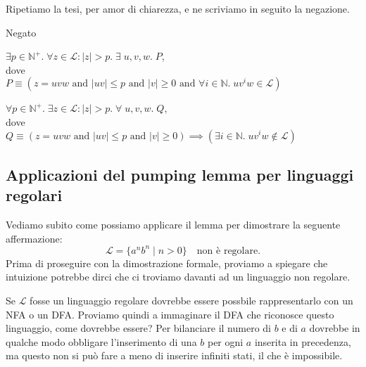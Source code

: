 \documentclass[class=book, crop=false, oneside, 12pt]{standalone}
\begin{document}
Ripetiamo la tesi, per amor di chiarezza, e ne scriviamo in seguito la negazione.
\begin{labeling}{Negato}
    \item[Tesi] 
    \(\exists p \in \mathbb{N}^+ . \;\forall z \in \mathcal{L}:|z|>p . \; \exists \;u, v, w . \; P\), \\ 
    dove \\
    \(P \equiv (z = uvw \textrm{ and } |uv| \le p \textrm{ and } |v| \ge 0 \textrm{ and } \forall i \in \mathbb{N} . \; uv^iw \in \mathcal{L}) \)
    \item[Negato]
    \(\forall p \in \mathbb{N}^+ . \;\exists z \in \mathcal{L}:|z|>p . \; \forall \;u, v, w . \; Q\), \\
    dove \\
    \(Q \equiv (z = uvw \textrm{ and } |uv| \le p \textrm{ and } |v| \ge 0) \implies (\exists i \in \mathbb{N} . \; uv^iw \notin \mathcal{L}) \) 
\end{labeling}

\subsection{Applicazioni del pumping lemma per linguaggi regolari}
Vediamo subito come possiamo applicare il lemma per dimostrare la seguente affermazione:
\begin{equation}
    \mathcal{L} = \{a^n b^n \mid n>0\} \quad \textrm{non è regolare.}
    \label{pl_regular_languages_ex_1}
\end{equation}
Prima di proseguire con la dimostrazione formale, proviamo a spiegare che intuizione potrebbe dirci che ci troviamo davanti ad un linguaggio non regolare.

Se \(\mathcal{L}\) fosse un linguaggio regolare dovrebbe essere possbile rappresentarlo con un NFA o un DFA. Proviamo quindi a immaginare il DFA che riconosce questo linguaggio, come dovrebbe essere? Per bilanciare il numero di \(b\) e di \(a\) dovrebbe in qualche modo obbligare l’inserimento di una \(b\) per ogni \(a\) inserita in precedenza, ma questo non si può fare a meno di inserire infiniti stati, il che è impossibile.
\end{document}
